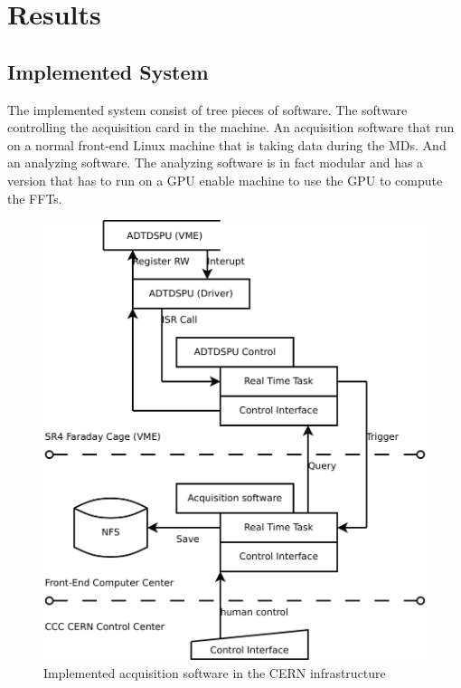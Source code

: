%

\chapter{Results}

\section{Implemented System}

The implemented system consist of tree pieces of software. The software controlling the acquisition card in the machine. An acquisition software that run on a normal front-end Linux machine that is taking data during the \glspl{MD}. And an analyzing software. The analyzing software is in fact modular and has a version that has to run on a GPU enable machine to use the GPU to compute the \glspl{FFT}.

\begin{figure}[H]
\caption{Implemented acquisition software in the CERN infrastructure}
\centering
\includegraphics[scale=0.3]{ImplementedSoftFesa.pdf}
\end{figure}

